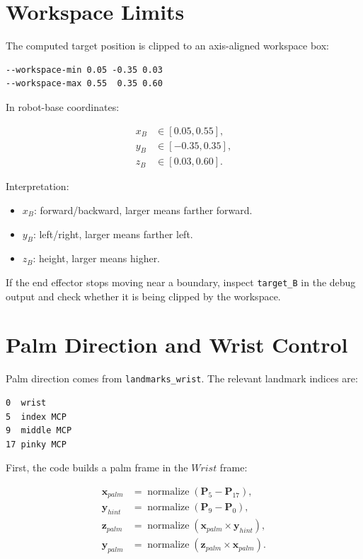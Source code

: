 \documentclass[11pt]{article}
\begin{document}
\section{Workspace Limits}

The computed target position is clipped to an axis-aligned workspace box:

\begin{lstlisting}
--workspace-min 0.05 -0.35 0.03
--workspace-max 0.55  0.35 0.60
\end{lstlisting}

In robot-base coordinates:

\begin{align}
x_B &\in [0.05, 0.55], \\
y_B &\in [-0.35, 0.35], \\
z_B &\in [0.03, 0.60].
\end{align}

Interpretation:

\begin{itemize}
  \item $x_B$: forward/backward, larger means farther forward.
  \item $y_B$: left/right, larger means farther left.
  \item $z_B$: height, larger means higher.
\end{itemize}

If the end effector stops moving near a boundary, inspect \texttt{target\_B} in
the debug output and check whether it is being clipped by the workspace.

\section{Palm Direction and Wrist Control}

Palm direction comes from \texttt{landmarks\_wrist}. The relevant landmark
indices are:

\begin{lstlisting}
0  wrist
5  index MCP
9  middle MCP
17 pinky MCP
\end{lstlisting}

First, the code builds a palm frame in the $Wrist$ frame:

\begin{align}
\mathbf{x}_{palm}
  &= \operatorname{normalize}(\mathbf{P}_5-\mathbf{P}_{17}), \\
\mathbf{y}_{hint}
  &= \operatorname{normalize}(\mathbf{P}_9-\mathbf{P}_0), \\
\mathbf{z}_{palm}
  &= \operatorname{normalize}(\mathbf{x}_{palm}\times\mathbf{y}_{hint}), \\
\mathbf{y}_{palm}
  &= \operatorname{normalize}(\mathbf{z}_{palm}\times\mathbf{x}_{palm}).
\end{align}
\end{document}
